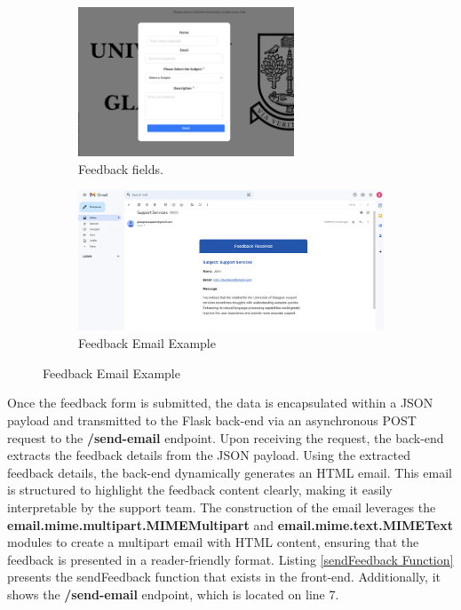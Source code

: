 \documentclass{l4proj}
\begin{document}
\begin{figure}[ht]
  \centering
  \begin{subfigure}[b]{0.45\textwidth}
    \includegraphics[height=1.75in]{images/feedbackui.png} %
    \caption{Feedback fields.}
    \label{fig:feedback_fields}
  \end{subfigure}
  \hfill %
  \begin{subfigure}[b]{0.5\textwidth}
    \includegraphics[height=1.65in]{images/emailfeedbackexample.png} %
    \caption{Feedback Email Example}
    \label{fig:feedback_email_example}
  \end{subfigure}
\end{figure}



Once the feedback form is submitted, the data is encapsulated within a JSON payload and transmitted to the Flask back-end via an asynchronous POST request to the \textbf{/send-email} endpoint. Upon receiving the request, the back-end extracts the feedback details from the JSON payload. Using the extracted feedback details, the back-end dynamically generates an HTML email. This email is structured to highlight the feedback content clearly, making it easily interpretable by the support team. The construction of the email leverages the \textbf{email.mime.multipart.MIMEMultipart} and \textbf{email.mime.text.MIMEText} modules to create a multipart email with HTML content, ensuring that the feedback is presented in a reader-friendly format. Listing \ref{sendFeedback Function} presents the sendFeedback function that exists in the front-end. Additionally, it shows the \textbf{/send-email} endpoint, which is located on line 7.
\end{document}
